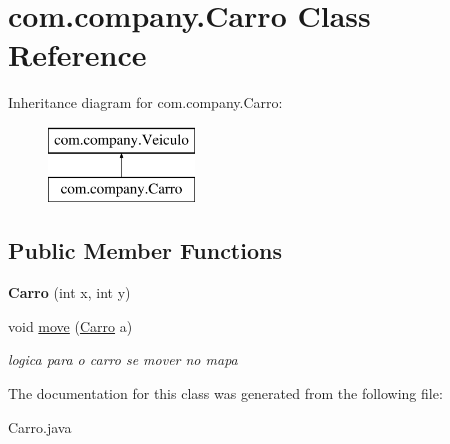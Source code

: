 \hypertarget{classcom_1_1company_1_1_carro}{}\section{com.\+company.\+Carro Class Reference}
\label{classcom_1_1company_1_1_carro}
Inheritance diagram for com.\+company.\+Carro\+:\begin{figure}[H]
\begin{center}
\leavevmode
\includegraphics[height=2.000000cm]{classcom_1_1company_1_1_carro}
\end{center}
\end{figure}
\subsection*{Public Member Functions}
\begin{DoxyCompactItemize}
\item 
\mbox{\label{classcom_1_1company_1_1_carro_a37f52c32727826ff07e5daf63f9079ef}} 
{\bfseries Carro} (int x, int y)
\item 
\mbox{\label{classcom_1_1company_1_1_carro_aa768871c4c1c6514f123442ee55915f8}} 
void \mbox{\hyperlink{classcom_1_1company_1_1_carro_aa768871c4c1c6514f123442ee55915f8}{move}} (\mbox{\hyperlink{classcom_1_1company_1_1_carro}{Carro}} a)
\begin{DoxyCompactList}\small\item\em logica para o carro se mover no mapa \end{DoxyCompactList}\end{DoxyCompactItemize}


The documentation for this class was generated from the following file\+:\begin{DoxyCompactItemize}
\item 
Carro.\+java\end{DoxyCompactItemize}
